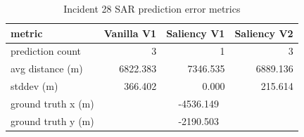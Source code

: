 \begin{table}[ht]
\centering
\caption{Incident 28 SAR prediction error metrics}
\label{tab:sar-incident-28}
\begin{tabular}{lrrr}
\hline
metric & Vanilla V1 & Saliency V1 & Saliency V2 \\
\hline
prediction count & 3 & 1 & 3 \\
avg distance (m) & 6822.383 & 7346.535 & 6889.136 \\
stddev (m) & 366.402 & 0.000 & 215.614 \\
ground truth x (m) & \multicolumn{3}{c}{-4536.149} \\
ground truth y (m) & \multicolumn{3}{c}{-2190.503} \\
\hline
\end{tabular}
\end{table}
